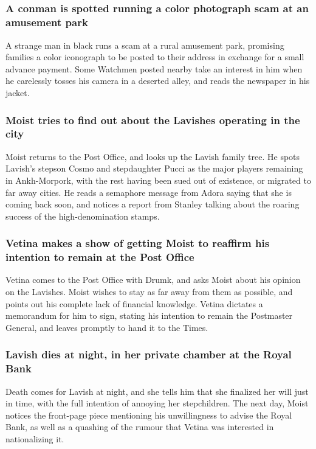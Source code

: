 \subsection{}
\subsubsection{A conman is spotted running a color photograph scam at an amusement park}
A strange man in black runs a scam at a rural amusement park, promising families a color iconograph
to be posted to their address in exchange for a small advance payment. Some Watchmen posted nearby
take an interest in him when he carelessly tosses his camera in a deserted alley, and reads the
newspaper in his jacket.

\subsubsection{\Gls{Moist} tries to find out about the Lavishes operating in the city}
\Gls{Moist} returns to the Post Office, and looks up the Lavish family tree. He spots \Gls{Lavish}'s
stepson \Gls{Cosmo} and stepdaughter \Gls{Pucci} as the major players remaining in Ankh-Morpork,
with the rest having been sued out of existence, or migrated to far away cities. He reads a
semaphore message from \Gls{Adora} saying that she is coming back soon, and notices a report from
\Gls{Stanley} talking about the roaring success of the high-denomination stamps.

\subsubsection{\Gls{Vetina} makes a show of getting \Gls{Moist} to reaffirm his intention to
    remain at the Post Office}
\Gls{Vetina} comes to the Post Office with \Gls{Drumk}, and asks \Gls{Moist} about his opinion on
the Lavishes. \Gls{Moist} wishes to stay as far away from them as possible, and points out his
complete lack of financial knowledge. \Gls{Vetina} dictates a memorandum for him to sign, stating
his intention to remain the Postmaster General, and leaves promptly to hand it to the Times.

\subsubsection{\Gls{Lavish} dies at night, in her private chamber at the Royal Bank}
\Gls{Death} comes for \Gls{Lavish} at night, and she tells him that she finalized her will just in
time, with the full intention of annoying her stepchildren. The next day, \Gls{Moist} notices the
front-page piece mentioning his unwillingness to advise the Royal Bank, as well as a quashing of
the rumour that \Gls{Vetina} was interested in nationalizing it.

